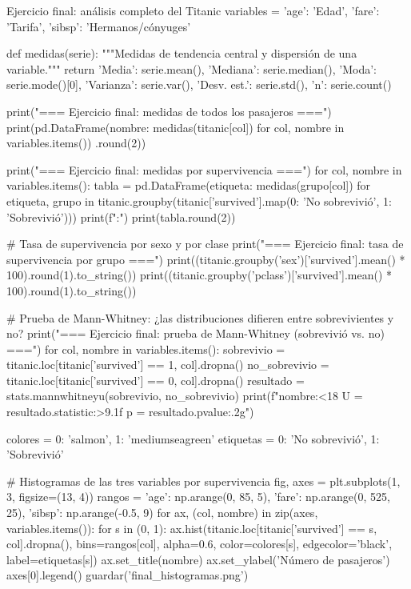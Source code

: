 \documentclass[11pt,letterpaper]{article}
\begin{document}
\begin{codigo}[label=cod:final]{Ejercicio final: análisis completo del Titanic}
variables = {'age': 'Edad', 'fare': 'Tarifa', 'sibsp': 'Hermanos/cónyuges'}


def medidas(serie):
    """Medidas de tendencia central y dispersión de una variable."""
    return {'Media': serie.mean(), 'Mediana': serie.median(), 'Moda': serie.mode()[0],
            'Varianza': serie.var(), 'Desv. est.': serie.std(), 'n': serie.count()}


print("\n=== Ejercicio final: medidas de todos los pasajeros ===")
print(pd.DataFrame({nombre: medidas(titanic[col]) for col, nombre in variables.items()})
      .round(2))

print("\n=== Ejercicio final: medidas por supervivencia ===")
for col, nombre in variables.items():
    tabla = pd.DataFrame({etiqueta: medidas(grupo[col]) for etiqueta, grupo in
                          titanic.groupby(titanic['survived'].map({0: 'No sobrevivió',
                                                                   1: 'Sobrevivió'}))})
    print(f":")
    print(tabla.round(2))

# Tasa de supervivencia por sexo y por clase
print("\n=== Ejercicio final: tasa de supervivencia por grupo ===")
print((titanic.groupby('sex')['survived'].mean() * 100).round(1).to_string())
print((titanic.groupby('pclass')['survived'].mean() * 100).round(1).to_string())

# Prueba de Mann-Whitney: ¿las distribuciones difieren entre sobrevivientes y no?
print("\n=== Ejercicio final: prueba de Mann-Whitney (sobrevivió vs. no) ===")
for col, nombre in variables.items():
    sobrevivio = titanic.loc[titanic['survived'] == 1, col].dropna()
    no_sobrevivio = titanic.loc[titanic['survived'] == 0, col].dropna()
    resultado = stats.mannwhitneyu(sobrevivio, no_sobrevivio)
    print(f"{nombre:<18} U = {resultado.statistic:>9.1f}   p = {resultado.pvalue:.2g}")

colores = {0: 'salmon', 1: 'mediumseagreen'}
etiquetas = {0: 'No sobrevivió', 1: 'Sobrevivió'}

# Histogramas de las tres variables por supervivencia
fig, axes = plt.subplots(1, 3, figsize=(13, 4))
rangos = {'age': np.arange(0, 85, 5), 'fare': np.arange(0, 525, 25), 'sibsp': np.arange(-0.5, 9)}
for ax, (col, nombre) in zip(axes, variables.items()):
    for s in (0, 1):
        ax.hist(titanic.loc[titanic['survived'] == s, col].dropna(), bins=rangos[col],
                alpha=0.6, color=colores[s], edgecolor='black', label=etiquetas[s])
    ax.set_title(nombre)
    ax.set_ylabel('Número de pasajeros')
axes[0].legend()
guardar('final_histogramas.png')


\end{codigo}
\end{document}
